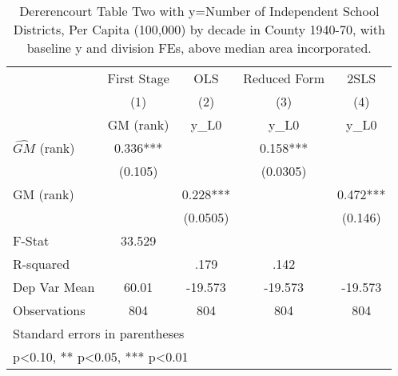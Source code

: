 \begin{table}[htbp]\centering
\def\sym#1{\ifmmode^{#1}\else\(^{#1}\)\fi}
\caption{Dererencourt Table Two with y=Number of Independent School Districts, Per Capita (100,000) by decade in County 1940-70, with baseline y and division FEs, above median area incorporated.}
\begin{tabular}{l*{4}{c}}
\toprule
                    & First Stage   &         OLS   &Reduced Form   &        2SLS   \\
                    &\multicolumn{1}{c}{(1)}&\multicolumn{1}{c}{(2)}&\multicolumn{1}{c}{(3)}&\multicolumn{1}{c}{(4)}\\
                    &\multicolumn{1}{c}{GM  (rank)}&\multicolumn{1}{c}{y\_L0}&\multicolumn{1}{c}{y\_L0}&\multicolumn{1}{c}{y\_L0}\\
\midrule
$\hat{GM}$ (rank)   &       0.336***&               &       0.158***&               \\
                    &     (0.105)   &               &    (0.0305)   &               \\
\addlinespace
GM  (rank)          &               &       0.228***&               &       0.472***\\
                    &               &    (0.0505)   &               &     (0.146)   \\
\midrule
F-Stat              &      33.529   &               &               &               \\
R-squared           &               &        .179   &        .142   &               \\
Dep Var Mean        &       60.01   &     -19.573   &     -19.573   &     -19.573   \\
Observations        &         804   &         804   &         804   &         804   \\
\bottomrule
\multicolumn{5}{l}{\footnotesize Standard errors in parentheses}\\
\multicolumn{5}{l}{\footnotesize * p<0.10, ** p<0.05, *** p<0.01}\\
\end{tabular}
\end{table}
